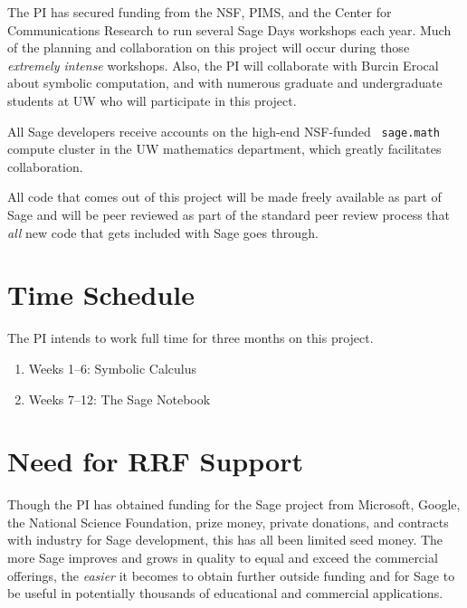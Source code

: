 \documentclass[11pt]{article}
\begin{document}
The PI has secured funding from the NSF, PIMS, and the Center for
Communications Research to run several Sage Days workshops each year.
Much of the planning and collaboration on this project will occur
during those {\em extremely intense} workshops. Also, the PI will
collaborate with Burcin Erocal about symbolic computation, and with
numerous graduate and undergraduate students at UW who will
participate in this project.

All Sage developers receive accounts on the high-end NSF-funded {\tt
  sage.math} compute cluster in the UW mathematics department, which
greatly facilitates collaboration.

All code that comes out of this project will be made freely available
as part of Sage and will be peer reviewed as part of the standard peer
review process that {\em all} new code that gets included with Sage
goes through.

\section{Time Schedule}

The PI intends to work full time for three months on this project.

\begin{enumerate}
\item Weeks 1--6: Symbolic Calculus
\item Weeks 7--12: The Sage Notebook
\end{enumerate}


\section{Need for RRF Support}

Though the PI has obtained funding for the Sage project from
Microsoft, Google, the National Science Foundation, prize money,
private donations, and contracts with industry for Sage development,
this has all been limited seed money.  The more Sage improves and
grows in quality to equal and exceed the commercial offerings, the
{\em easier} it becomes to obtain further outside funding and for Sage
to be useful in potentially thousands of educational and commercial
applications.
\end{document}
